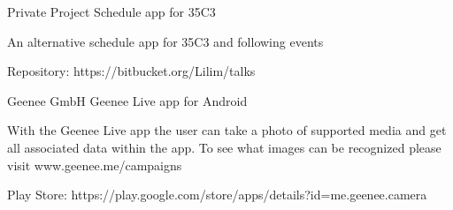 

\begin{cventries}

  \cventry
    {Private Project} %
    {Schedule app for 35C3} %
    {} %
    {} %
    {
      \begin{cvitems} %
        \item {An alternative schedule app for 35C3 and following events}
        \item {Repository: https://bitbucket.org/Lilim/talks}
      \end{cvitems}
    }

  \cventry
    {Geenee GmbH} %
    {Geenee Live app for Android} %
    {} %
    {} %
    {
      \begin{cvitems} %
        \item {With the Geenee Live app the user can take a photo of supported media and get all associated data within the app.
To see what images can be recognized please visit www.geenee.me/campaigns}
        \item {Play Store: https://play.google.com/store/apps/details?id=me.geenee.camera}
      \end{cvitems}
    }

\end{cventries}
